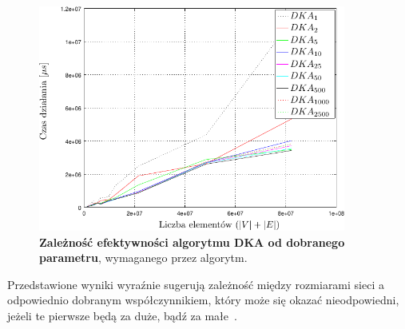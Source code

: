 \begin{figure}[!htbp]
	\centering
	\includegraphics[width=0.9\textwidth]{Chapter_IV/DKA-param_psfrag.pdf}
	\caption{\textbf{Zależność efektywności algorytmu \textsc{DKA} od dobranego parametru}, wymaganego przez algorytm. }\label{fig:plotDKA-param}
\end{figure}

Przedstawione wyniki wyraźnie sugerują zależność między rozmiarami sieci a odpowiednio dobranym współczynnikiem, który może się okazać nieodpowiedni, jeżeli te pierwsze będą za duże, bądź za małe~\cite[$3.3.2$,$3.10.3$]{Dissertation}.